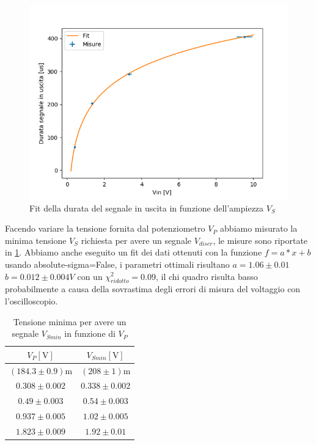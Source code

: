 \documentclass{article}
\begin{document}
		\begin{figure}
			\centering
			\includegraphics[width=\linewidth]{immagini/1c.png}
			\caption{Fit della durata del segnale in uscita in funzione dell'ampiezza $V_S$}
			\label{fit:1c}
		\end{figure}
		
		Facendo variare la tensione fornita dal potenziometro $V_P$ abbiamo misurato la minima tensione $V_S$ richiesta per avere un segnale $V_{discr}$, le misure sono riportate in \ref{tab 1c2}. Abbiamo anche eseguito un fit dei dati ottenuti con la funzione $f=a*x+b$ usando absolute-sigma=False, i parametri ottimali risultano $a=1.06\pm0.01$ $b=0.012\pm0.004 V$ con un $\chi^2_{ridotto}=0.09$, il chi quadro risulta basso probabilmente a causa della sovrastima degli errori di misura del voltaggio con l'oscilloscopio.
		\begin{table}
			\begin{center}
				\begin{tabular}{cc}
					\hline
					$V_P [\mathrm{V}]$&$V_{Smin} [\mathrm{V}]$ \\
					\hline
					$(184.3\pm0.9) \mathrm{m}$ & $(208\pm1)\mathrm{m}$ \\
					$0.308\pm0.002$ & $0.338\pm0.002$ \\
					$0.49\pm0.003$ & $0.54\pm0.003$ \\
					$0.937\pm0.005$ & $1.02\pm0.005$ \\
					$1.823\pm0.009$ & $1.92\pm0.01$ \\
					\hline
				\end{tabular}
			\end{center}
			\caption{Tensione minima per avere un segnale $V_{Smin}$ in funzione di $V_{P}$}
			\label{tab 1c2}
		\end{table}
		
\end{document}
